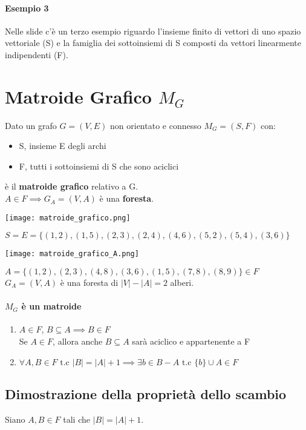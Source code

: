 \paragraph*{Esempio 3} Nelle slide c'è un terzo esempio riguardo l'insieme finito di vettori
di uno spazio vettoriale (S) e la famiglia dei sottoinsiemi di S composti da vettori 
linearmente indipendenti (F).
\section{Matroide Grafico $M_G$}
Dato un grafo $G=(V,E)$ non orientato e connesso $M_G = (S,F)$ con:
\begin{itemize}
    \item S, insieme E degli archi
    \item F, tutti i sottoinsiemi di S che sono aciclici
\end{itemize}
è il \textbf{matroide grafico} relativo a G.\\
$A \in F \implies G_A = (V,A)$ è una \textbf{foresta}.
\begin{center}
    \texttt{[image: matroide\_grafico.png]}
\end{center}
$S = E = \{(1,2), (1,5), (2,3), (2,4), (4,6), (5,2), (5,4), (3,6)\}$\\
\begin{center}
    \texttt{[image: matroide\_grafico\_A.png]}
\end{center}
$A = \{(1,2), (2,3), (4,8), (3,6), (1,5), (7,8), (8,9)\} \in F$\\
$G_A=(V,A)$ è una foresta di $|V|-|A| = 2$ alberi.
\paragraph*{$M_G$ è un matroide}
\begin{enumerate}
    \item $A \in F$, $B \subseteq A \implies B \in F$\\
    Se $A \in F$, allora anche $B \subseteq A$ sarà aciclico e appartenente a F
    \item $\forall A,B \in F \text{ t.c } |B| = |A| + 1 \implies \exists b \in B-A
    \text{ t.c } \{b\} \cup A \in F$
\end{enumerate}
\subsection{Dimostrazione della proprietà dello scambio}
Siano $A,B \in F$ tali che $|B|=|A| + 1$.   


